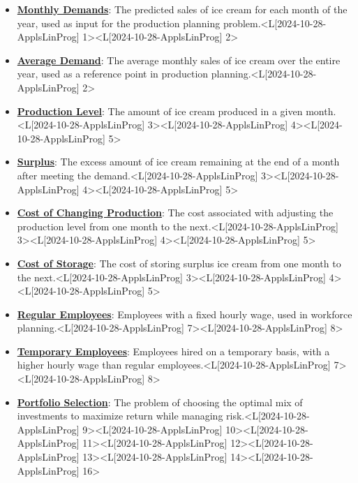 \documentclass{article}%
\begin{document}
\begin{itemize}[[leftmargin=*]]%
\item \href{https://www.math.purdue.edu/~yipn/421/2024-10-28-ApplsLinProg.pdf#page=1}{\textbf{Monthly Demands}}: The predicted sales of ice cream for each month of the year, used as input for the production planning problem.<L[2024-10-28-ApplsLinProg] 1><L[2024-10-28-ApplsLinProg] 2>%
\item \href{https://www.math.purdue.edu/~yipn/421/2024-10-28-ApplsLinProg.pdf#page=2}{\textbf{Average Demand}}: The average monthly sales of ice cream over the entire year, used as a reference point in production planning.<L[2024-10-28-ApplsLinProg] 2>%
\item \href{https://www.math.purdue.edu/~yipn/421/2024-10-28-ApplsLinProg.pdf#page=3}{\textbf{Production Level}}: The amount of ice cream produced in a given month.<L[2024-10-28-ApplsLinProg] 3><L[2024-10-28-ApplsLinProg] 4><L[2024-10-28-ApplsLinProg] 5>%
\item \href{https://www.math.purdue.edu/~yipn/421/2024-10-28-ApplsLinProg.pdf#page=3}{\textbf{Surplus}}: The excess amount of ice cream remaining at the end of a month after meeting the demand.<L[2024-10-28-ApplsLinProg] 3><L[2024-10-28-ApplsLinProg] 4><L[2024-10-28-ApplsLinProg] 5>%
\item \href{https://www.math.purdue.edu/~yipn/421/2024-10-28-ApplsLinProg.pdf#page=3}{\textbf{Cost of Changing Production}}: The cost associated with adjusting the production level from one month to the next.<L[2024-10-28-ApplsLinProg] 3><L[2024-10-28-ApplsLinProg] 4><L[2024-10-28-ApplsLinProg] 5>%
\item \href{https://www.math.purdue.edu/~yipn/421/2024-10-28-ApplsLinProg.pdf#page=3}{\textbf{Cost of Storage}}: The cost of storing surplus ice cream from one month to the next.<L[2024-10-28-ApplsLinProg] 3><L[2024-10-28-ApplsLinProg] 4><L[2024-10-28-ApplsLinProg] 5>%
\item \href{https://www.math.purdue.edu/~yipn/421/2024-10-28-ApplsLinProg.pdf#page=7}{\textbf{Regular Employees}}: Employees with a fixed hourly wage, used in workforce planning.<L[2024-10-28-ApplsLinProg] 7><L[2024-10-28-ApplsLinProg] 8>%
\item \href{https://www.math.purdue.edu/~yipn/421/2024-10-28-ApplsLinProg.pdf#page=7}{\textbf{Temporary Employees}}: Employees hired on a temporary basis, with a higher hourly wage than regular employees.<L[2024-10-28-ApplsLinProg] 7><L[2024-10-28-ApplsLinProg] 8>%
\item \href{https://www.math.purdue.edu/~yipn/421/2024-10-28-ApplsLinProg.pdf#page=9}{\textbf{Portfolio Selection}}: The problem of choosing the optimal mix of investments to maximize return while managing risk.<L[2024-10-28-ApplsLinProg] 9><L[2024-10-28-ApplsLinProg] 10><L[2024-10-28-ApplsLinProg] 11><L[2024-10-28-ApplsLinProg] 12><L[2024-10-28-ApplsLinProg] 13><L[2024-10-28-ApplsLinProg] 14><L[2024-10-28-ApplsLinProg] 16>%

\end{itemize}
\end{document}
